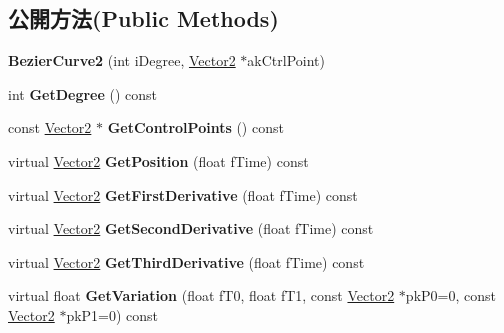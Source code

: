 \subsection*{公開方法(Public Methods)}
\begin{DoxyCompactItemize}
\item 
{\bfseries Bezier\+Curve2} (int i\+Degree, \hyperlink{class_i_dream_sky_1_1_vector2}{Vector2} $\ast$ak\+Ctrl\+Point)\hypertarget{class_i_dream_sky_1_1_bezier_curve2_af490cae4281a4f09b21dc5652a813ebc}{}\label{class_i_dream_sky_1_1_bezier_curve2_af490cae4281a4f09b21dc5652a813ebc}

\item 
int {\bfseries Get\+Degree} () const \hypertarget{class_i_dream_sky_1_1_bezier_curve2_a1e82a53646b6540128b1e8598841801e}{}\label{class_i_dream_sky_1_1_bezier_curve2_a1e82a53646b6540128b1e8598841801e}

\item 
const \hyperlink{class_i_dream_sky_1_1_vector2}{Vector2} $\ast$ {\bfseries Get\+Control\+Points} () const \hypertarget{class_i_dream_sky_1_1_bezier_curve2_a5dabe72c99f95b7bd0848f1fe9a03403}{}\label{class_i_dream_sky_1_1_bezier_curve2_a5dabe72c99f95b7bd0848f1fe9a03403}

\item 
virtual \hyperlink{class_i_dream_sky_1_1_vector2}{Vector2} {\bfseries Get\+Position} (float f\+Time) const \hypertarget{class_i_dream_sky_1_1_bezier_curve2_a4cf3e5d15ed30466c8142c1636387f38}{}\label{class_i_dream_sky_1_1_bezier_curve2_a4cf3e5d15ed30466c8142c1636387f38}

\item 
virtual \hyperlink{class_i_dream_sky_1_1_vector2}{Vector2} {\bfseries Get\+First\+Derivative} (float f\+Time) const \hypertarget{class_i_dream_sky_1_1_bezier_curve2_a584190b1aa55f43e3100c721c933f0fe}{}\label{class_i_dream_sky_1_1_bezier_curve2_a584190b1aa55f43e3100c721c933f0fe}

\item 
virtual \hyperlink{class_i_dream_sky_1_1_vector2}{Vector2} {\bfseries Get\+Second\+Derivative} (float f\+Time) const \hypertarget{class_i_dream_sky_1_1_bezier_curve2_afec5a24b2a9f194f30f85de7e5a0a4bb}{}\label{class_i_dream_sky_1_1_bezier_curve2_afec5a24b2a9f194f30f85de7e5a0a4bb}

\item 
virtual \hyperlink{class_i_dream_sky_1_1_vector2}{Vector2} {\bfseries Get\+Third\+Derivative} (float f\+Time) const \hypertarget{class_i_dream_sky_1_1_bezier_curve2_ad1be7da6a4bcff480dbd84c92a780974}{}\label{class_i_dream_sky_1_1_bezier_curve2_ad1be7da6a4bcff480dbd84c92a780974}

\item 
virtual float {\bfseries Get\+Variation} (float f\+T0, float f\+T1, const \hyperlink{class_i_dream_sky_1_1_vector2}{Vector2} $\ast$pk\+P0=0, const \hyperlink{class_i_dream_sky_1_1_vector2}{Vector2} $\ast$pk\+P1=0) const \hypertarget{class_i_dream_sky_1_1_bezier_curve2_a9819fa586f09b6d21692d199f410d82b}{}\label{class_i_dream_sky_1_1_bezier_curve2_a9819fa586f09b6d21692d199f410d82b}

\end{DoxyCompactItemize}
